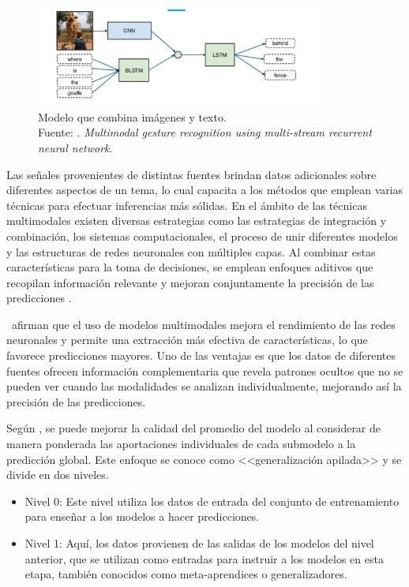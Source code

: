 \begin{figure}[!ht]
	\begin{center}
		\includegraphics[width=0.85\textwidth]{2/figures/multimodal_network.png}
		\caption[Modelo que combina imágenes y texto]{Modelo que combina imágenes y texto.\\
		Fuente: \cite{tec_nishida2015multimodal}. \textit{Multimodal gesture recognition using multi-stream recurrent neural network}.}
		\label{2:fig7}
	\end{center}
\end{figure}

Las señales provenientes de distintas fuentes brindan datos adicionales sobre diferentes aspectos de un tema, lo cual capacita a los métodos que emplean varias técnicas para efectuar inferencias más sólidas. En el ámbito de las técnicas multimodales existen diversas estrategias como las estrategias de integración y combinación, los sistemas computacionales, el proceso de unir diferentes modelos y las estructuras de redes neuronales con múltiples capas. Al combinar estas características para la toma de decisiones, se emplean enfoques aditivos que recopilan información relevante y mejoran conjuntamente la precisión de las predicciones \cite{bk_deng2018deeplearningnlp}.

\cite{tec_baheti2020introduction_mdl} afirman que el uso de modelos multimodales mejora el rendimiento de las redes neuronales y permite una extracción más efectiva de características, lo que favorece predicciones mayores. Uno de las ventajas es que los datos de diferentes fuentes ofrecen información complementaria que revela patrones ocultos que no se pueden ver cuando las modalidades se analizan individualmente, mejorando así la precisión de las predicciones.

Según \cite{tec_brownlee2018stacked_models}, se puede mejorar la calidad del promedio del modelo al considerar de manera ponderada las aportaciones individuales de cada submodelo a la predicción global. Este enfoque se conoce como <<generalización apilada>> y se divide en dos niveles.

\begin{itemize}
    \item Nivel 0: Este nivel utiliza los datos de entrada del conjunto de entrenamiento para enseñar a los modelos a hacer predicciones.
    \item Nivel 1: Aquí, los datos provienen de las salidas de los modelos del nivel anterior, que se utilizan como entradas para instruir a los modelos en esta etapa, también conocidos como meta-aprendices o generalizadores.
\end{itemize}


